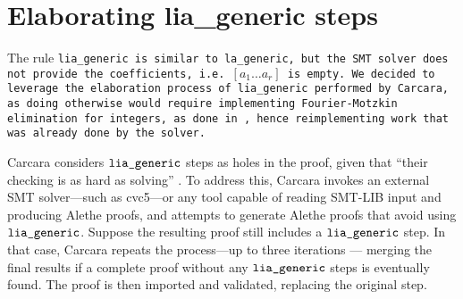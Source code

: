 \section{Elaborating lia\_generic steps}
\label{sec:elaboration-lia}

The rule \tt{lia\_generic} is similar to \tt{la\_generic}, but the SMT solver does not provide the coefficients,
i.e.\ \colorbox{orange!30}{$[a_1 \dots a_r]$} is empty.
We decided to leverage the elaboration process of \tt{lia\_generic} performed by Carcara, as doing otherwise would require implementing Fourier-Motzkin elimination for integers, as done in \cite{micromega,omegatest}, hence reimplementing work that was already done by the solver.

Carcara considers $\tt{lia\_generic}$ steps as holes in the proof, given that ``their checking is as hard as solving'' \cite[\S 3.2]{carcara}.
To address this, Carcara invokes an external SMT solver—such as cvc5—or any tool capable of reading SMT-LIB input and producing Alethe proofs, and attempts to generate Alethe proofs that avoid using $\tt{lia\_generic}$. 
Suppose the resulting proof still includes a $\tt{lia\_generic}$ step. In that case, Carcara repeats the process—up to three iterations — merging the final results if a complete proof without any $\tt{lia\_generic}$ steps is eventually found.
The proof is then imported and validated, replacing the original step.

